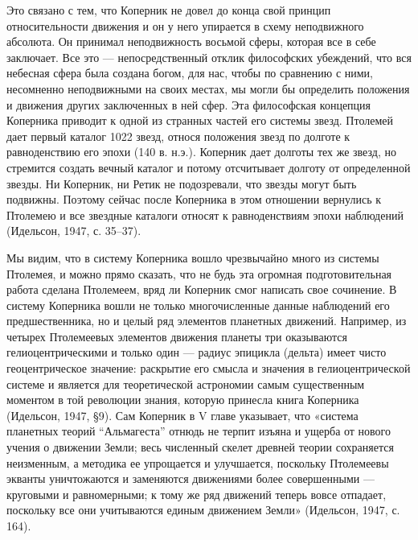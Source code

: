 Это  связано с  тем,  что  Коперник не  довел  до  конца свой  принцип
относительности движения  и он у  него упирается в  схему неподвижного
абсолюта. Он принимал неподвижность восьмой  сферы, которая все в себе
заключает. Все это ---  непосредственный отклик философских убеждений,
что  вся  небесная  сфера  была  создана  богом,  для  нас,  чтобы  по
сравнению с ними, несомненно неподвижными на своих местах, мы могли бы
определить положения  и движения  других заключенных  в ней  сфер. Эта
философская концепция  Коперника приводит  к одной из  странных частей
его системы  звезд. Птолемей  дает первый  каталог 1022  звезд, относя
положения звезд  по долготе к  равноденствию его эпохи (140  в. н.э.).
Коперник  дает  долготы тех  же  звезд,  но стремится  создать  вечный
каталог  и  потому  отсчитывает  долготу от  определенной  звезды.  Ни
Коперник, ни  Ретик не  подозревали, что  звезды могут  быть подвижны.
Поэтому сейчас после Коперника в этом отношении вернулись к Птолемею и
все  звездные  каталоги  относят  к  равноденствиям  эпохи  наблюдений
(Идельсон, 1947, с. 35--37).

Мы  видим,  что  в  систему   Коперника  вошло  чрезвычайно  много  из
системы  Птолемея, и  можно прямо  сказать, что  не будь  эта огромная
подготовительная  работа  сделана  Птолемеем, вряд  ли  Коперник  смог
написать  свое   сочинение.  В  систему  Коперника   вошли  не  только
многочисленные  данные  наблюдений  его предшественника,  но  и  целый
ряд  элементов планетных  движений. Например,  из четырех  Птолемеевых
элементов  движения  планеты   три  оказываются  гелиоцентрическими  и
только один  --- радиус эпицикла (дельта)  имеет чисто геоцентрическое
значение: раскрытие его смысла  и значения в гелиоцентрической системе
и является для теоретической  астрономии самым существенным моментом в
той  революции знания,  которую  принесла  книга Коперника  (Идельсон,
1947, §9).  Сам Коперник в  V главе указывает, что  «система планетных
теорий  ``Альмагеста'' отнюдь  не  терпит изъяна  и  ущерба от  нового
учения  о  движении  Земли;   весь  численный  скелет  древней  теории
сохраняется  неизменным,  а  методика   ее  упрощается  и  улучшается,
поскольку  Птолемеевы  экванты  уничтожаются и  заменяются  движениями
более  совершенными  ---  круговыми  и равномерными;  к  тому  же  ряд
движений теперь  вовсе отпадает, поскольку все  они учитываются единым
движением Земли» (Идельсон, 1947, с. 164).


